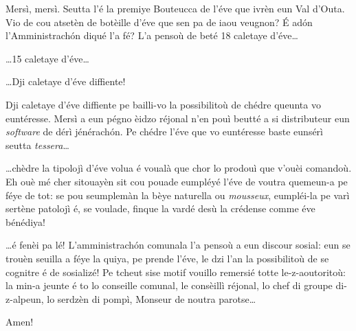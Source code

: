 \begin{drama}

\Seunteuccospeaks Mersì, mersì. Seutta l'é la premiye Bouteucca de l'éve que ivrèn eun Val d'Outa. Vio de cou atsetèn de botèille d'éve que sen pa de iaou veugnon? \'E ad\'on l’Amministrach\'on diqué l’a fé? L'a pensoù de beté 18 caletaye d’éve\ldots


\Seunteuccospeaks \ldots 15 caletaye d’éve\ldots


\Seunteuccospeaks \ldots Dji caletaye d’éve
 diffiente!
 
 
\Seunteuccospeaks  Dji caletaye d’éve
 diffiente pe bailli-vo la possibilitoù de chédre queunta vo euntéresse. Mersì a eun pégno èidzo réjonal n'en pouì beutté a si distributeur eun \textit{software} de dérì jénérach\'on. Pe chédre l'éve que vo euntéresse baste eunsérì  seutta \textit{tessera}\ldots
 
 
\Seunteuccospeaks \ldots  chèdre la tipolojì d’éve volua é voualà que chor lo prodouì que v'ouèi comandoù. Eh ouè mé cher sitouayèn sit cou pouade eumpléyé l'éve de voutra quemeun-a pe féye de tot: se pou seumplemàn la bèye naturella ou \textit{mousseux}, eumpléi-la pe varì sertène patolojì é, se voulade, finque la vardé desù la crédense comme éve bénédiya!


\Seunteuccospeaks \ldots é fenèi pa lé! L’amministrach\'on comunala l’a pensoù a eun discour sosial: eun se trouèn seuilla a féye la quiya, pe prende l’éve, le dzi l’an la possibilitoù de se cognitre é de sosializé! Pe tcheut sise motif vouillo remersié totte le-z-aoutoritoù: la min-a jeunte é to lo conseille comunal, le consèillì réjonal, lo chef di groupe di-z-alpeun, lo serdzèn di pompì, Monseur de noutra parotse\ldots

\Donspeaks {} Amen!



\end{drama}
